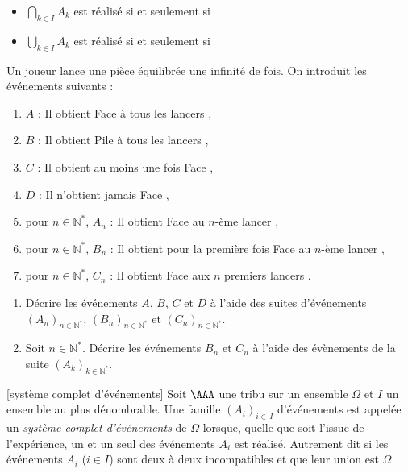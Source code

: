 \documentclass[french,11pt,twoside]{VcCours}
\begin{document}
\begin{itemize}
  \item $\bigcap\limits_{k\in I} A_k$ est réalisé si et seulement si 
  \item  $\bigcup\limits_{k\in I} A_k$ est réalisé si et seulement si 
\end{itemize}


\begin{Exemple} Un joueur lance  une pièce équilibrée une infinité de fois. On introduit les événements suivants :
\begin{enumerate}
\item $A$ : \og Il obtient Face à tous les lancers \fg{},
\item $B$ : \og Il obtient Pile à tous les lancers \fg{},
\item $C$ : \og Il obtient au moins une fois Face \fg{},
\item $D$ : \og Il n'obtient jamais Face \fg{},
\item pour $n \in \mathbb{N}^*$, $A_n$ : \og Il obtient Face au $n$-ème lancer \fg{},
\item pour $n \in \mathbb{N}^*$, $B_n$ : \og Il obtient pour la première fois Face au $n$-ème lancer \fg{},
\item pour $n \in \mathbb{N}^*$, $C_n$ : \og Il obtient Face aux $n$ premiers lancers \fg{}.
\end{enumerate}
\begin{enumerate}
\item Décrire les événements $A$, $B$, $C$ et $D$ à l'aide des suites d'événements $(A_n)_{n \in \mathbb{N}^*}$, $(B_n)_{n \in \mathbb{N}^*}$ et $(C_n)_{n \in \mathbb{N}^*}$.

\vspace{3cm}
\item Soit $n \in \mathbb{N}^*$. Décrire les événements $B_n$ et $C_n$ à l'aide des évènements de la suite $(A_k)_{k \in \mathbb{N}^*}$.

\vspace{3cm}
\end{enumerate}
\end{Exemple}



\begin{Definition}{}[système complet d'événements]
Soit $\AAA$ une tribu sur un ensemble $\Omega$ et $I$ un ensemble au plus dénombrable.
Une famille $(A_i)_{i\in\, I}$ {d'événements} est appelée un \emph{système complet d'événements} de $\Omega$ lorsque, quelle que soit l'issue de l'expérience, un et un seul des événements $A_i$ est réalisé. Autrement dit si les événements $A_i$ ($i \in I$) sont deux à deux incompatibles et que leur union est $\Omega$.
\end{Definition}
\end{document}
